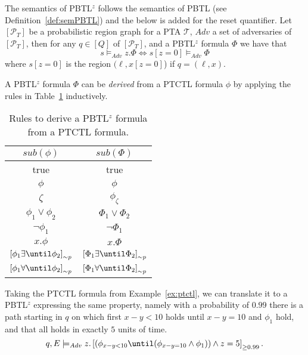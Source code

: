 \begin{defi}
The semantics of PBTL$^{z}$ follows the semantics of PBTL (see Definition~\ref{def:semPBTL}) and the below is added for the reset quantifier. Let $[\mathcal{P}_{T}]$ be a probabilistic region graph for a PTA $\mathcal{T}$, $Adv$ a set of adversaries of $[\mathcal{P}_{T}]$, then for any $q\in[Q]$ of $[\mathcal{P}_{T}]$, and a PBTL$^{z}$ formula $\Phi$ we have that
\[
s\models_{Adv} z.\Phi \Leftrightarrow s[z=0] \models_{Adv} \Phi
\]
where $s[z=0]$ is the region $(\ell,x[z=0]$) if $q=(\ell,x)$.
\end{defi}

\begin{defi}
A PBTL$^{z}$ formula $\Phi$ can be \emph{derived} from a PTCTL formula $\phi$ by applying the  rules in Table~\ref{tab:ptctl2pbtl} inductively.
\begin{table}[H]
\begin{center}
    \begin{tabular}{c|c}
        $sub(\phi)$ & $sub(\Phi)$ \\ \hline
        true & true \\ \hline
        $\phi$ & $\phi$ \\ \hline
        $\zeta$ & $\phi_{\zeta}$ \\ \hline
        $\phi_{1} \lor \phi_{2}$ & $\Phi_{1} \lor \Phi_{2}$ \\ \hline
        $\lnot \phi_{1}$ & $\lnot \Phi_{1}$ \\ \hline
        $x.\phi$ & $x.\Phi$ \\ \hline
        $\left[\phi_{1} \exists\until \phi_{2}\right]_{\sim p}$ & $\left[\Phi_{1} \exists\until \Phi_{2}\right]_{\sim p}$ \\ \hline
        $\left[\phi_{1} \forall\until \phi_{2}\right]_{\sim p}$ & $\left[\Phi_{1} \forall\until \Phi_{2}\right]_{\sim p}$ \\
    \end{tabular}
    \label{tab:ptctl2pbtl}
    \caption{Rules to derive a PBTL$^{z}$ formula from a PTCTL formula.}
\end{center}
\end{table}
\end{defi}

\begin{ex}
Taking the PTCTL formula from Example~\ref{ex:ptctl}, we can translate it to a PBTL$^{z}$ expressing the same property, namely with a probability of $0.99$ there is a path starting in $q$ on which first $x-y<10$ holds until $x-y=10$ and $\phi_{1}$ hold, and that all holds in exactly $5$ units of time.
\[
q,E\models_{Adv} z.\left[(\phi_{x-y<10}\until(\phi_{x-y=10}\land\phi_{1}))\land z=5\right]_{\geq0.99}.
\]
\end{ex}
